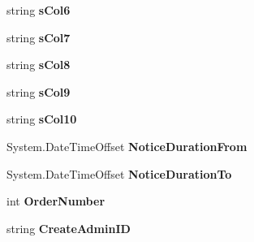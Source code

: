 \begin{DoxyCompactItemize}
\item 
string {\bfseries s\+Col6}\hypertarget{a00168_a80e83dc9020568827c964e2556c23ce9}{}\label{a00168_a80e83dc9020568827c964e2556c23ce9}

\item 
string {\bfseries s\+Col7}\hypertarget{a00168_aa85af891e291f0f2e86365a9492dd2d1}{}\label{a00168_aa85af891e291f0f2e86365a9492dd2d1}

\item 
string {\bfseries s\+Col8}\hypertarget{a00168_aa5bc028cff20b68516b6fe0412f64548}{}\label{a00168_aa5bc028cff20b68516b6fe0412f64548}

\item 
string {\bfseries s\+Col9}\hypertarget{a00168_a4f2d0f2707ed13c9802cbad5a7662c69}{}\label{a00168_a4f2d0f2707ed13c9802cbad5a7662c69}

\item 
string {\bfseries s\+Col10}\hypertarget{a00168_a0ec4778fffe5769c438c083a9d173d4d}{}\label{a00168_a0ec4778fffe5769c438c083a9d173d4d}

\item 
System.\+Date\+Time\+Offset {\bfseries Notice\+Duration\+From}\hypertarget{a00168_a71a3cf55e440c9b5c0587f80ad373b5d}{}\label{a00168_a71a3cf55e440c9b5c0587f80ad373b5d}

\item 
System.\+Date\+Time\+Offset {\bfseries Notice\+Duration\+To}\hypertarget{a00168_af75e3ca795c77d1f730ca5def52f6f84}{}\label{a00168_af75e3ca795c77d1f730ca5def52f6f84}

\item 
int {\bfseries Order\+Number}\hypertarget{a00168_a7593c488c8cef59cd43239cd3ced7753}{}\label{a00168_a7593c488c8cef59cd43239cd3ced7753}

\item 
string {\bfseries Create\+Admin\+ID}\hypertarget{a00168_a4f4d95edcff365da61df7e937b57ce8c}{}\label{a00168_a4f4d95edcff365da61df7e937b57ce8c}


\end{DoxyCompactItemize}
